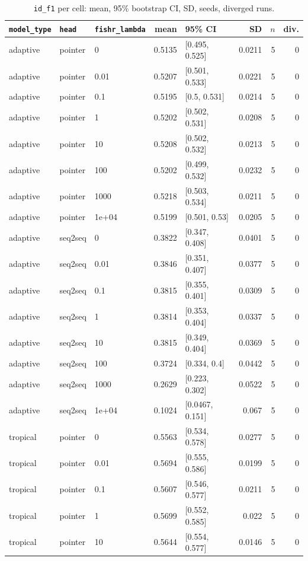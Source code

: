 \documentclass[10pt]{article}
\begin{document}
{\small
\begin{longtable}{lllrlrrr}
\caption{\texttt{id\_f1} per cell: mean, 95\% bootstrap CI, SD, seeds, diverged runs.}\label{tab:summary-id_f1}\\
\toprule
\texttt{model\_type} & \texttt{head} & \texttt{fishr\_lambda} & mean & 95\% CI & SD & $n$ & div.\\
\midrule
\endhead
adaptive & pointer & 0 & 0.5135 & [0.495, 0.525] & 0.0211 & 5 & 0\\
adaptive & pointer & 0.01 & 0.5207 & [0.501, 0.533] & 0.0221 & 5 & 0\\
adaptive & pointer & 0.1 & 0.5195 & [0.5, 0.531] & 0.0214 & 5 & 0\\
adaptive & pointer & 1 & 0.5202 & [0.502, 0.531] & 0.0208 & 5 & 0\\
adaptive & pointer & 10 & 0.5208 & [0.502, 0.532] & 0.0213 & 5 & 0\\
adaptive & pointer & 100 & 0.5202 & [0.499, 0.532] & 0.0232 & 5 & 0\\
adaptive & pointer & 1000 & 0.5218 & [0.503, 0.534] & 0.0211 & 5 & 0\\
adaptive & pointer & 1e+04 & 0.5199 & [0.501, 0.53] & 0.0205 & 5 & 0\\
adaptive & seq2seq & 0 & 0.3822 & [0.347, 0.408] & 0.0401 & 5 & 0\\
adaptive & seq2seq & 0.01 & 0.3846 & [0.351, 0.407] & 0.0377 & 5 & 0\\
adaptive & seq2seq & 0.1 & 0.3815 & [0.355, 0.401] & 0.0309 & 5 & 0\\
adaptive & seq2seq & 1 & 0.3814 & [0.353, 0.404] & 0.0337 & 5 & 0\\
adaptive & seq2seq & 10 & 0.3815 & [0.349, 0.404] & 0.0369 & 5 & 0\\
adaptive & seq2seq & 100 & 0.3724 & [0.334, 0.4] & 0.0442 & 5 & 0\\
adaptive & seq2seq & 1000 & 0.2629 & [0.223, 0.302] & 0.0522 & 5 & 0\\
adaptive & seq2seq & 1e+04 & 0.1024 & [0.0467, 0.151] & 0.067 & 5 & 0\\
tropical & pointer & 0 & 0.5563 & [0.534, 0.578] & 0.0277 & 5 & 0\\
tropical & pointer & 0.01 & 0.5694 & [0.555, 0.586] & 0.0199 & 5 & 0\\
tropical & pointer & 0.1 & 0.5607 & [0.546, 0.577] & 0.0211 & 5 & 0\\
tropical & pointer & 1 & 0.5699 & [0.552, 0.585] & 0.022 & 5 & 0\\
tropical & pointer & 10 & 0.5644 & [0.554, 0.577] & 0.0146 & 5 & 0\\

\end{longtable}}
\end{document}
